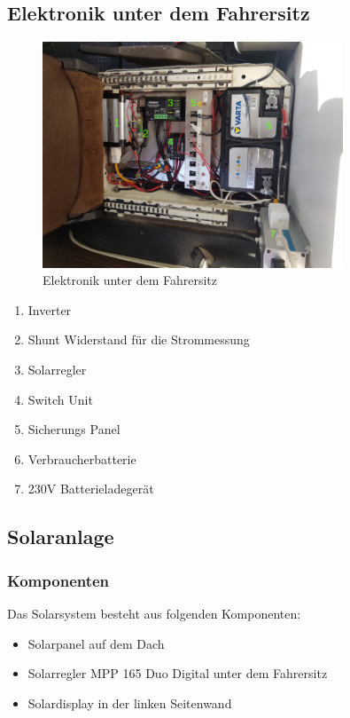 \subsection{Elektronik unter dem Fahrersitz}
\begin{figure}[H]
	\centering
    \includegraphics[width=0.8\textwidth]{../Bilder/Anleitung/Elektronik_Sitz.png}
	\caption{Elektronik unter dem Fahrersitz}
    \label{Fahrersitz}
\end{figure}

\begin{enumerate}
    \item Inverter
    \item Shunt Widerstand für die Strommessung
    \item Solarregler
    \item Switch Unit
    \item Sicherungs Panel
    \item Verbraucherbatterie
    \item 230V Batterieladegerät
\end{enumerate}

\newpage
\subsection{Solaranlage}

\subsubsection{Komponenten}
Das Solarsystem besteht aus folgenden Komponenten:

\begin{itemize}
     \item Solarpanel auf dem Dach
     \item Solarregler MPP 165 Duo Digital unter dem Fahrersitz
     \item Solardisplay in der linken Seitenwand
\end{itemize} 

